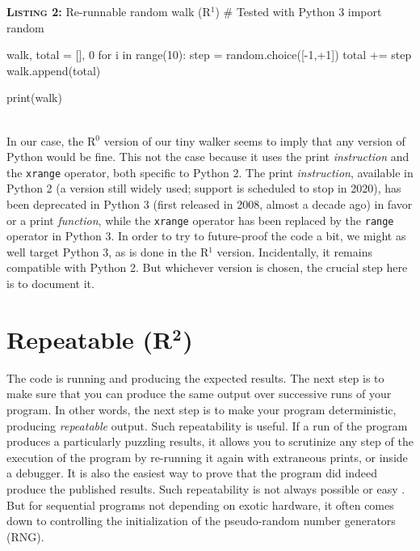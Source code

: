 \documentclass[a4paper,11pt]{article}
\begin{document}
\noindent \begin{minipage}[c]{\linewidth}
\begin{code}{\textbf{\textsc{Listing 2:}} Re-runnable random walk (R$^1$)}
# Tested with Python 3
import random

walk, total = [], 0
for i in range(10):
    step = random.choice([-1,+1])
    total += step
    walk.append(total)

print(walk)
\end{code}
\end{minipage}\\

In our case, the R$^0$ version of our tiny walker seems to imply that any version of Python would be fine. This not the case because it uses the print {\em instruction} and the {\tt xrange} operator, both specific to Python 2. The print {\em instruction}, available in Python 2 (a version still widely used; support is scheduled to stop in 2020), has been deprecated in Python 3 (first released in 2008, almost a decade ago) in favor or a  print {\em function}, while the {\tt xrange} operator has been replaced by the {\tt range} operator in Python 3. In order to try to future-proof the code a bit, we might as well target Python 3, as is done in the R$^1$ version. Incidentally, it remains compatible with Python 2. But whichever version is chosen, the crucial step here is to document it.


\section*{Repeatable (R$^{\mathbf 2}$)}

The code is running and producing the expected results. The next step is to make sure that you can produce the same output over successive runs of your program. In other words, the next step is to make your program deterministic, producing {\em repeatable} output. Such repeatability is useful. If a run of the program produces a particularly puzzling results, it allows you to scrutinize any step of the execution of the program by re-running it again with extraneous prints, or inside a debugger. It is also the easiest way to prove that the program did indeed produce the published results. Such repeatability is not always possible or easy \citep{Diethelm:2012, Courtes:2015}. But for sequential programs not depending on exotic hardware, it often comes down to controlling the initialization of the pseudo-random number generators (RNG).\\
\end{document}
